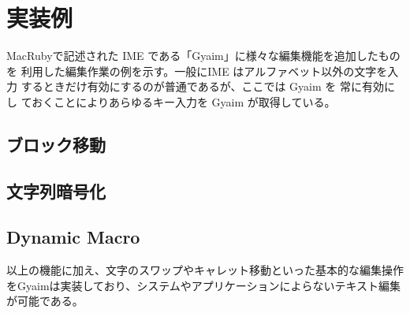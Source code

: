 \section{実装例}

MacRubyで記述された IME である「Gyaim」に様々な編集機能を追加したものを
利用した編集作業の例を示す。一般にIME はアルファベット以外の文字を入力
するときだけ有効にするのが普通であるが、ここでは Gyaim を 常に有効にし
ておくことによりあらゆるキー入力を Gyaim が取得している。

\subsection{ブロック移動}

\subsection{文字列暗号化}
\subsection{Dynamic Macro}

以上の機能に加え、文字のスワップやキャレット移動といった基本的な編集操作をGyaimは実装しており、システムやアプリケーションによらないテキスト編集が可能である。
